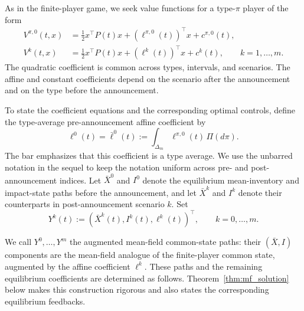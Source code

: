 \documentclass[12pt]{article}
\numberwithin{equation}{section}
\theoremstyle{definition}
\begin{document}
As in the finite-player game, we seek value functions for a type-\(\pi\)
player of the form
\begin{equation}\label{eq:mf_quadratic_value_ansatz}
\begin{aligned}
V^{\pi,0}(t,x)
&=\frac12x^\top P(t)x+(\ell^{\pi,0}(t))^\top x+c^{\pi,0}(t),
\\
V^k(t,x)
&=\frac12x^\top P(t)x+(\ell^k(t))^\top x+c^k(t),
\qquad k=1,\ldots,m.
\end{aligned}
\end{equation}
The quadratic coefficient is common across types, intervals, and scenarios.
The affine and constant coefficients depend on the scenario after the
announcement and on the type before the announcement.

To state the coefficient equations and the corresponding optimal controls,
define the type-average pre-announcement affine coefficient by
\[
\ell^0(t)=\bar\ell^0(t)
:=
\int_{\Delta_m}\ell^{\pi,0}(t)\,\Pi(d\pi).
\]
The bar emphasizes that this coefficient is a type average. We use the
unbarred notation in the sequel to keep the notation uniform across
pre- and post-announcement indices.
Let \(\bar X^0\) and \(I^0\) denote the equilibrium mean-inventory and
impact-state paths before the announcement, and let \(\bar X^k\) and \(I^k\)
denote their counterparts in post-announcement scenario \(k\). Set
\begin{equation}\label{eq:mf_augmented_common_state_paths}
Y^k(t):=(\bar X^k(t),I^k(t),\ell^k(t))^\top,
\qquad k=0,\ldots,m.
\end{equation}

We call \(Y^0,\ldots,Y^m\) the augmented mean-field common-state paths:
their \((\bar X,I)\) components are the mean-field analogue of the
finite-player common state, augmented by the affine coefficient \(\ell^k\).
These paths and the remaining equilibrium coefficients are determined as
follows.
Theorem~\ref{thm:mf_solution} below makes this construction rigorous and also
states the corresponding equilibrium feedbacks.
\end{document}
